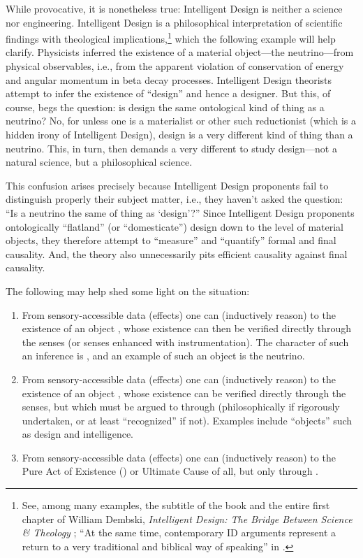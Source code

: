 While provocative, it is nonetheless true: Intelligent Design is neither a science nor engineering. 
Intelligent Design is a philosophical interpretation of scientific findings with theological implications,\footnote{
See, among many examples, the subtitle of the book and the entire first chapter of William Dembski, \textit{Intelligent Design: The Bridge Between Science \& Theology} \citeyearpar[][pp.~25--48]{dembski2002}; “At the same time, contemporary ID arguments represent a return to a very traditional and biblical way of speaking” in \citet[][p.~250]{richards2010b}.
}
which the following example will help clarify.
Physicists inferred the existence of a material object---the neutrino---from physical observables, i.e., from the apparent violation of conservation of energy and angular momentum in beta decay processes. Intelligent Design theorists attempt to infer the existence of ``design'' and hence a designer. But this, of course, begs the question: is design the same ontological kind of thing as a neutrino? No, for unless one is a materialist or other such reductionist (which is a hidden irony of Intelligent Design), design is a very different kind of thing than a neutrino.  This, in turn, then demands a very different  to study design---not a natural science, but a philosophical science.

This confusion arises precisely because Intelligent Design proponents fail to distinguish properly their subject matter, i.e., they haven't asked the question: ``Is a neutrino the same  of thing as `design'?'' Since Intelligent Design proponents ontologically ``flatland'' (or ``domesticate'') design down to the level of material objects, they therefore attempt to ``measure'' and ``quantify'' formal and final causality. And, the theory also unnecessarily pits efficient causality against final causality.

The following may help shed some light on the situation:
\begin{enumerate}
\item From sensory-accessible data (effects) one can  (inductively reason) to the existence of an object , whose existence can then be verified directly through the senses (or senses enhanced with instrumentation). The character of such an inference is , and an example of such an object is the neutrino.
\item From sensory-accessible data (effects) one can  (inductively reason) to the existence of an object , whose existence can  be verified directly through the senses, but which must be argued to through  (philosophically if rigorously undertaken, or at least ``recognized'' if not). Examples include ``objects'' such as design and intelligence.
\item From sensory-accessible data (effects) one can  (inductively reason) to the Pure Act of Existence () or Ultimate Cause of all, but only through .
\end{enumerate}

